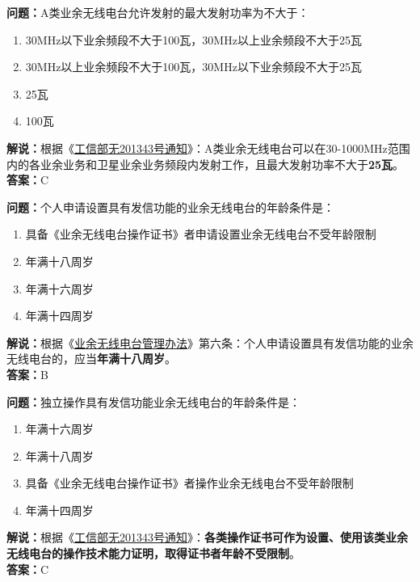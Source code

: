 \textbf{问题：}A类业余无线电台允许发射的最大发射功率为不大于：
\begin{enumerate}[label=\Alph*), leftmargin=1.5cm]
	\item 30MHz以下业余频段不大于100瓦，30MHz以上业余频段不大于25瓦
	\item 30MHz以上业余频段不大于100瓦，30MHz以下业余频段不大于25瓦
	\item 25瓦
	\item 100瓦
\end{enumerate}
\textbf{解说：}根据《\href{http://www.crac.org.cn/wp-content/uploads/2013/02/%E5%B7%A5%E4%BF%A1%E9%83%A8%E6%97%A0201343%E5%8F%B7.pdf}{工信部无201343号通知}》：A类业余无线电台可以在30-1000MHz范围内的各业余业务和卫星业余业务频段内发射工作，且最大发射功率不大于\textbf{25瓦}。\\\textbf{答案：}C


\textbf{问题：}个人申请设置具有发信功能的业余无线电台的年龄条件是：
\begin{enumerate}[label=\Alph*), leftmargin=1.5cm]
	\item 具备《业余无线电台操作证书》者申请设置业余无线电台不受年龄限制
	\item 年满十八周岁
	\item 年满十六周岁
	\item 年满十四周岁
\end{enumerate}
\textbf{解说：}根据《\href{https://www.miit.gov.cn/jgsj/zfs/bmgz/art/2020/art_147b69815b3641caad9047735f94c860.html}{业余无线电台管理办法}》第六条：个人申请设置具有发信功能的业余无线电台的，应当\textbf{年满十八周岁}。\\\textbf{答案：}B


\textbf{问题：}独立操作具有发信功能业余无线电台的年龄条件是：
\begin{enumerate}[label=\Alph*), leftmargin=1.5cm]
	\item 年满十六周岁
	\item 年满十八周岁
	\item 具备《业余无线电台操作证书》者操作业余无线电台不受年龄限制
	\item 年满十四周岁
\end{enumerate}
\textbf{解说：}根据《\href{http://www.crac.org.cn/wp-content/uploads/2013/02/%E5%B7%A5%E4%BF%A1%E9%83%A8%E6%97%A0201343%E5%8F%B7.pdf}{工信部无201343号通知}》：\textbf{各类操作证书可作为设置、使用该类业余无线电台的操作技术能力证明，取得证书者年龄不受限制}。\\\textbf{答案：}C


